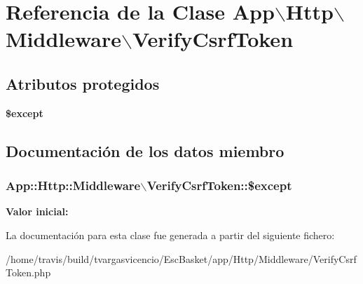 \hypertarget{class_app_1_1_http_1_1_middleware_1_1_verify_csrf_token}{\section{\-Referencia de la \-Clase \-App$\backslash$\-Http$\backslash$\-Middleware$\backslash$\-Verify\-Csrf\-Token}
\label{class_app_1_1_http_1_1_middleware_1_1_verify_csrf_token}
}
\subsection*{\-Atributos protegidos}
\begin{DoxyCompactItemize}
\item 
{\bfseries \$except}
\end{DoxyCompactItemize}


\subsection{\-Documentación de los datos miembro}
\hypertarget{class_app_1_1_http_1_1_middleware_1_1_verify_csrf_token_a6dd303cbb80a5640ab0db9644422035f}{
\subsubsection[{\$except}]{\setlength{\rightskip}{0pt plus 5cm}\-App\-::\-Http\-::\-Middleware$\backslash$\-Verify\-Csrf\-Token\-::\$except}}\label{class_app_1_1_http_1_1_middleware_1_1_verify_csrf_token_a6dd303cbb80a5640ab0db9644422035f}
{\bfseries \-Valor inicial\-:}
\begin{DoxyCode}
 [
        
    ]
\end{DoxyCode}


\-La documentación para esta clase fue generada a partir del siguiente fichero\-:\begin{DoxyCompactItemize}
\item 
/home/travis/build/tvargasvicencio/\-Esc\-Basket/app/\-Http/\-Middleware/\-Verify\-Csrf\-Token.\-php\end{DoxyCompactItemize}
